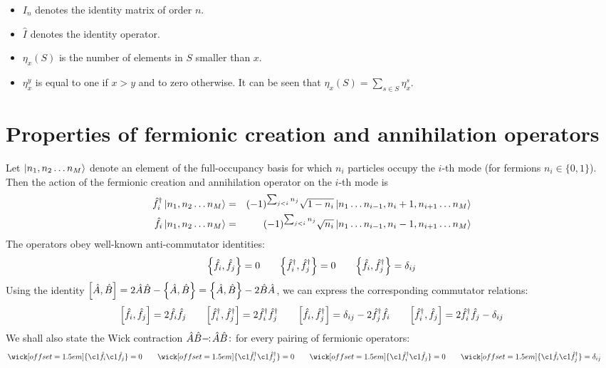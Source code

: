 \documentclass[12pt]{article}
\newcommand{\hc}{^\dagger}
\newcommand{\normord}[1]{:\mathrel{\mspace{2mu}#1\mspace{2mu}}:}
\begin{document}
\begin{itemize}
		\item $I_n$ denotes the identity matrix of order $n$.
		\item $\hat{I}$ denotes the identity operator.
		\item $\eta_x(S)$ is the number of elements in $S$ smaller than $x$.
		\item $\eta_x^y$ is equal to one if $x>y$ and to zero otherwise. It can be seen that $\eta_x(S)=\sum_{s\in S}\eta_x^s$.
	\end{itemize}
	
	\section{Properties of fermionic creation and annihilation operators}
	
	Let $\ket{n_1,n_2\dots n_M}$ denote an element of the full-occupancy basis for which $n_i$ particles occupy the $i$-th mode (for fermions $n_i\in\{0,1\}$). Then the action of the fermionic creation and annihilation operator on the $i$-th mode is \cite[Eq. 3.47]{fermionic_definition}
	\begin{eqnarray}
	\hat{f}\hc_i\ket{n_1,n_2\dots n_M}&=&(-1)^{\sum_{j<i}n_j}\sqrt{1-n_i}\ket{n_1\dots n_{i-1}, n_i + 1, n_{i+1}\dots n_M}\\
	\hat{f}_i\ket{n_1,n_2\dots n_M}&=&(-1)^{\sum_{j<i}n_j}\sqrt{n_i}\ket{n_1\dots n_{i-1}, n_i - 1, n_{i+1}\dots n_M}
	\end{eqnarray}
	The operators obey well-known anti-commutator identities:
	\begin{equation}\label{eq:anticommutators}
	\acomm{\hat{f}_i}{\hat{f}_j}=0\qquad\acomm{\hat{f}\hc_i}{\hat{f}\hc_j}=0\qquad\acomm{\hat{f}_i}{\hat{f}\hc_j}=\delta_{ij}
	\end{equation}
	Using the identity $\comm{\hat{A}}{\hat{B}}=2\hat{A}\hat{B}-\acomm{\hat{A}}{\hat{B}}=\acomm{\hat{A}}{\hat{B}}-2\hat{B}\hat{A}$, we can express the corresponding commutator relations:
	\begin{equation}\label{eq:commutators}
	\comm{\hat{f}_i}{\hat{f}_j}=2\hat{f}_i\hat{f}_j\qquad\comm{\hat{f}\hc_i}{\hat{f}\hc_j}=2\hat{f}\hc_i\hat{f}\hc_j\qquad\comm{\hat{f}_i}{\hat{f}\hc_j}=\delta_{ij}-2\hat{f}\hc_j\hat{f}_i\qquad \comm{\hat{f}\hc_i}{\hat{f}_j}=2\hat{f}\hc_i\hat{f}_j-\delta_{ij}
	\end{equation}
	We shall also state the Wick contraction $\hat{A}\hat{B}-\mkern-7mu\normord{\hat{A}\hat{B}}$ for every pairing of fermionic operators:
	\begin{equation}\label{eq:contractions}
	    \wick[offset=1.5em]{\c1{\hat{f}_i} \c1{\hat{f}_j}}=0\qquad\wick[offset=1.5em]{\c1{\hat{f}\hc_i} \c1{\hat{f}\hc_j}}=0\qquad\wick[offset=1.5em]{\c1{\hat{f}\hc_i} \c1{\hat{f}_j}}=0\qquad\wick[offset=1.5em]{\c1{\hat{f}_i} \c1{\hat{f}\hc_j}}=\delta_{ij}\qquad
	\end{equation}
\end{document}

